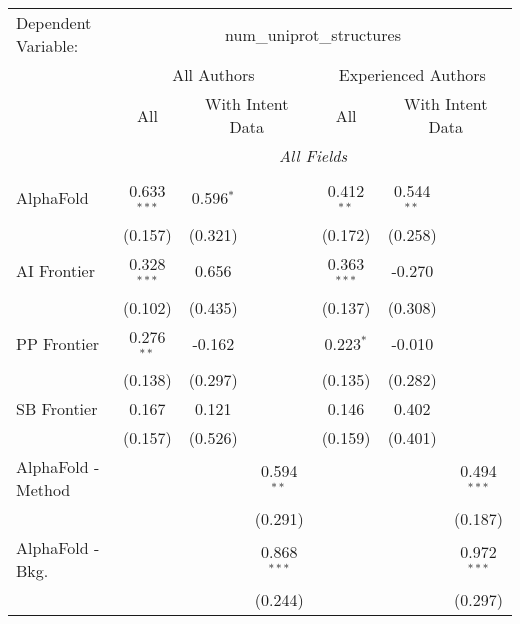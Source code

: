 \begingroup
\centering
\begin{tabular}{lcccccc}
   \tabularnewline \midrule \midrule
   Dependent Variable: & \multicolumn{6}{c}{num\_uniprot\_structures}\\
 & \multicolumn{3}{c}{All Authors} & \multicolumn{3}{c}{Experienced Authors} \\
\cmidrule(lr){2-4} \cmidrule(lr){5-7}
 & \multicolumn{1}{c}{All} & \multicolumn{2}{c}{With Intent Data} & \multicolumn{1}{c}{All} & \multicolumn{2}{c}{With Intent Data} \\
\cmidrule(lr){2-2} \cmidrule(lr){3-4} \cmidrule(lr){5-5} \cmidrule(lr){6-7}
 & \multicolumn{6}{c}{\textit{All Fields}} \\ \\
   AlphaFold                     & 0.633$^{***}$ & 0.596$^{*}$ &                & 0.412$^{**}$  & 0.544$^{**}$ &   \\   
                                 & (0.157)       & (0.321)     &                & (0.172)       & (0.258)      &   \\   
   AI Frontier                   & 0.328$^{***}$ & 0.656       &                & 0.363$^{***}$ & -0.270       &   \\   
                                 & (0.102)       & (0.435)     &                & (0.137)       & (0.308)      &   \\   
   PP Frontier                   & 0.276$^{**}$  & -0.162      &                & 0.223$^{*}$   & -0.010       &   \\   
                                 & (0.138)       & (0.297)     &                & (0.135)       & (0.282)      &   \\   
   SB Frontier                   & 0.167         & 0.121       &                & 0.146         & 0.402        &   \\   
                                 & (0.157)       & (0.526)     &                & (0.159)       & (0.401)      &   \\   
   AlphaFold - Method            &               &             & 0.594$^{**}$   &               &              & 0.494$^{***}$\\   
                                 &               &             & (0.291)        &               &              & (0.187)\\   
   AlphaFold - Bkg.              &               &             & 0.868$^{***}$  &               &              & 0.972$^{***}$\\   
                                 &               &             & (0.244)        &               &              & (0.297)\\   

\end{tabular}
